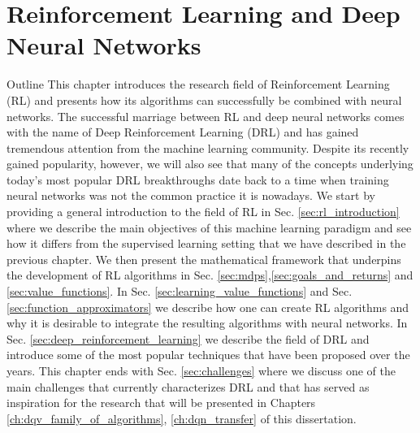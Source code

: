\chapter{Reinforcement Learning and Deep Neural Networks}
\label{ch:reinforcement_learning}


\begin{remark}{Outline}
This chapter introduces the research field of Reinforcement Learning (RL) and presents how its algorithms can successfully be combined with neural networks. The successful marriage between RL and deep neural networks comes with the name of Deep Reinforcement Learning (DRL) and has gained tremendous attention from the machine learning community. Despite its recently gained popularity, however, we will also see that many of the concepts underlying today's most popular DRL breakthroughs date back to a time when training neural networks was not the common practice it is nowadays. We start by providing a general introduction to the field of RL in Sec. \ref{sec:rl_introduction} where we describe the main objectives of this machine learning paradigm and see how it differs from the supervised learning setting that we have described in the previous chapter. We then present the mathematical framework that underpins the development of RL algorithms in Sec. \ref{sec:mdps},\ref{sec:goals_and_returns} and \ref{sec:value_functions}. In Sec. \ref{sec:learning_value_functions} and Sec. \ref{sec:function_approximators} we describe how one can create RL algorithms and why it is desirable to integrate the resulting algorithms with neural networks. In Sec. \ref{sec:deep_reinforcement_learning} we describe the field of DRL and introduce some of the most popular techniques that have been proposed over the years. This chapter ends with Sec. \ref{sec:challenges} where we discuss one of the main challenges that currently characterizes DRL and that has served as inspiration for the research that will be presented in Chapters \ref{ch:dqv_family_of_algorithms}, \ref{ch:dqn_transfer} of this dissertation.

\end{remark}


